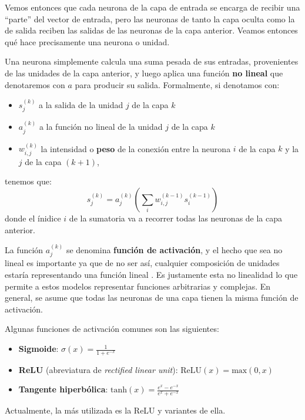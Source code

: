 \documentclass[../../main.tex]{subfiles}
\begin{document}
Vemos entonces que cada neurona de la capa de entrada se encarga de recibir una ``parte''
del vector de entrada\footnotemark, pero las neuronas de tanto la capa oculta como la de
salida reciben las salidas de las neuronas de la capa anterior. Veamos entonces qué hace
precisamente una neurona o unidad.

Una neurona simplemente calcula una suma pesada de sus entradas, provenientes de las
unidades de la capa anterior, y luego aplica una función \textbf{no lineal} que
denotaremos con \(a\) para producir su salida. Formalmente, si denotamos con:
\begin{itemize}[itemsep=0.1cm]
    \item \(s^{(k)}_j\) a la salida de la unidad \(j\) de la capa \(k\)
    \item \(a^{(k)}_j\) a la función no lineal de la unidad \(j\) de la capa \(k\)
    \item \(w^{(k)}_{i,j}\) la intensidad o \textbf{peso} de la conexión entre la
    neurona \(i\) de la capa \(k\) y la \(j\) de la capa \((k+1)\),
\end{itemize}
tenemos que:
\begin{equation}
    s^{(k)}_j = a^{(k)}_j \left( \sum_i w^{(k-1)}_{i,j} s^{(k-1)}_i \right)
    \label{eq:neuron}
\end{equation}
donde el ínidice \(i\) de la sumatoria va a recorrer todas las neuronas de la capa
anterior.


La función \(a^{(k)}_j\) se denomina \textbf{función de activación}, y el hecho que sea no
lineal es importante ya que de no ser así, cualquier composición de unidades estaría
representando una función lineal \cite{ai-a-modern-approach}. Es justamente esta no
linealidad lo que permite a estos modelos representar funciones arbitrarias
\cite{ai-a-modern-approach} y complejas. En general, se asume que todas las neuronas de
una capa tienen la misma función de activación.

Algunas funciones de activación comunes son las siguientes:
\begin{itemize}[itemsep=0.1cm]
    \item \textbf{Sigmoide}: \(\sigma(x)=\frac{1}{1+e^{-x}}\)
    \item \textbf{ReLU} (abreviatura de \textit{rectified linear unit}):
    \(\text{ReLU}(x) = \text{max}(0, x)\)
    \item \textbf{Tangente hiperbólica}: \(\text{tanh}(x)=\frac{e^x - e^{-x}}{e^x + e^{-x}}\)
\end{itemize}
Actualmente, la más utilizada es la ReLU y variantes de ella.
\end{document}
